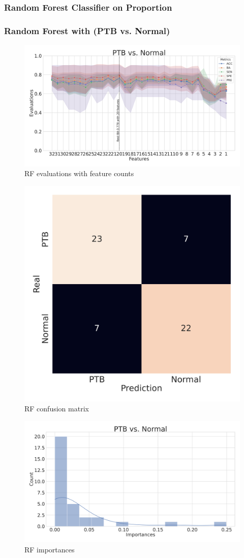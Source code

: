 \documentclass{beamer}
\begin{document}
    \subsubsection{Random Forest Classifier on Proportion}
    \begin{frame}[allowframebreaks]
        \frametitle{Random Forest with (PTB vs. Normal)}

        \begin{figure}
            \includegraphics[width=0.8 \linewidth]{figures/RandomForest_Proportion/singleton-RF.DADA2.homd.Mouth/metrics.pdf}
            \caption{RF evaluations with feature counts}
        \end{figure}

        \begin{figure}
            \includegraphics[width=0.5 \linewidth]{figures/RandomForest_Proportion/singleton-RF.DADA2.homd.Mouth/heatmap.pdf}
            \caption{RF confusion matrix}
        \end{figure}

        \begin{figure}
            \includegraphics[width=0.8 \linewidth]{figures/RandomForest_Proportion/singleton-RF.DADA2.homd.Mouth/importances.pdf}
            \caption{RF importances}
        \end{figure}


\end{frame}
\end{document}
